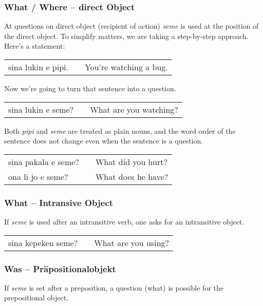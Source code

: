 \subsubsection*{What / Where -- direct Object}
%
At questions on direct object (recipient of action) \textit{seme} is used at the position of the direct object.
To simplify matters, we are taking a step-by-step approach.
Here's a statement:

\begin{supertabular}{p{5,5cm}|ll}
sina lukin e pipi. && You're watching a bug. \\
\end{supertabular} 

Now we're going to turn that sentence into a question. 

\begin{supertabular}{p{5,5cm}|ll}
sina lukin e seme? && What are you watching? \\
\end{supertabular} 

Both \textit{pipi} and \textit{seme} are treated as plain nouns, and the word order of the sentence does not change even when the sentence is a question. 

\begin{supertabular}{p{5,5cm}|ll}
sina pakala e seme? && What did you hurt? \\
ona li jo e seme? && What does he have? \\
\end{supertabular} 
%
\subsubsection*{What -- Intransive Object}

If \textit{seme} is used after an intransitive verb, one asks for an intransitive object. 

\begin{supertabular}{p{5,5cm}|ll}
sina kepeken seme? && What are you using? \\
\end{supertabular} 
%
\subsubsection*{Was -- Präpositionalobjekt}
%
If \textit{seme} is set after a preposition, a question (what) is possible for the prepositional object.

